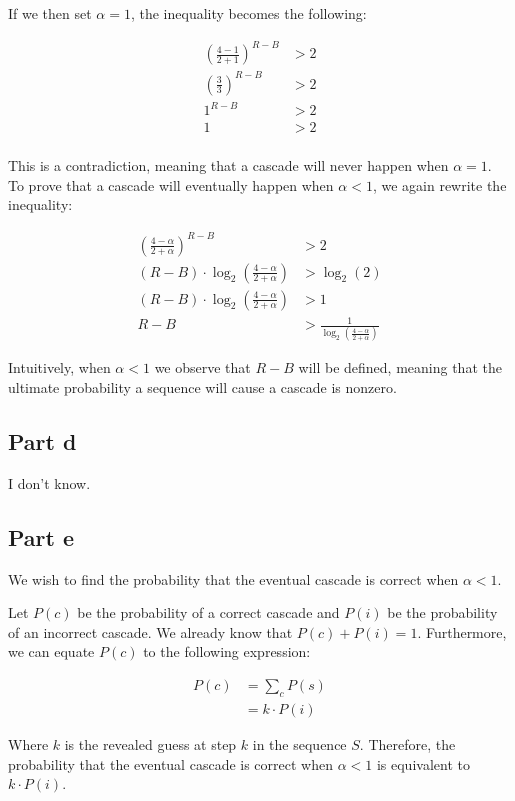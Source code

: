 \documentclass[12pt]{article}%
\begin{document}
If we then set $\alpha = 1$, the inequality becomes the following:

\begin{equation}
\begin{split}
(\frac{4 - 1}{2 + 1})^{R - B} &> 2\\
(\frac{3}{3})^{R - B} &> 2\\
1^{R - B} &> 2\\
1 &> 2\\
\end{split}
\end{equation}

This is a contradiction, meaning that a cascade will never happen when $\alpha = 1$. To prove that a cascade will eventually happen when $\alpha < 1$, we again rewrite the inequality:

\begin{equation}
\begin{split}
(\frac{4 - \alpha}{2 + \alpha})^{R - B} &> 2\\
(R - B) \cdot \log_2{(\frac{4 - \alpha}{2 + \alpha})} &> \log_2{(2)}\\
(R - B) \cdot \log_2{(\frac{4 - \alpha}{2 + \alpha})} &> 1\\
R - B &> \frac{1}{\log_2{(\frac{4 - \alpha}{2 + \alpha})}}
\end{split}
\end{equation}

Intuitively, when $\alpha < 1$ we observe that $R - B$ will be defined, meaning that the ultimate probability a sequence will cause a cascade is nonzero.

\subsection*{Part d}

I don’t know.

\subsection*{Part e}

We wish to find the probability that the eventual cascade is correct when $\alpha < 1$.

Let $P(c)$ be the probability of a correct cascade and $P(i)$ be the probability of an incorrect cascade. We already know that $P(c) + P(i) = 1$. Furthermore, we can equate $P(c)$ to the following expression:

\begin{equation}
\begin{split}
P(c) &= \sum_{c}P(s)\\
&= k \cdot P(i)
\end{split}
\end{equation}

Where $k$ is the revealed guess at step $k$ in the sequence $S$. Therefore, the probability that the eventual cascade is correct when $\alpha < 1$ is equivalent to $k \cdot P(i)$.
\end{document}
